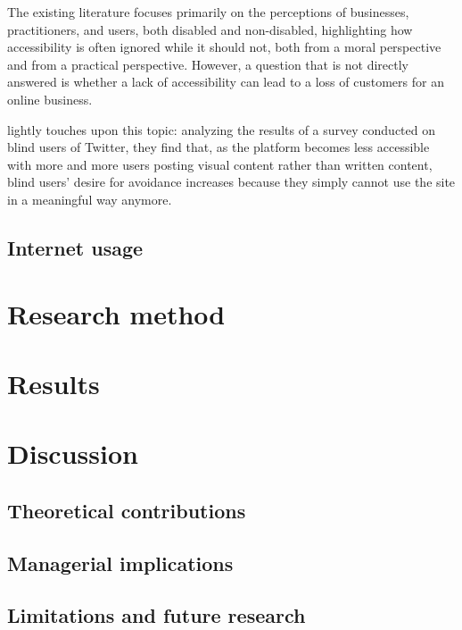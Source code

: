 \documentclass[12pt, a4paper]{article}
\begin{document}
The existing literature focuses primarily on the perceptions of businesses,
practitioners, and users, both disabled and non-disabled, highlighting how
accessibility is often ignored while it should not, both from a moral perspective and
from a practical perspective. However, a question that is not directly answered is
whether a lack of accessibility can lead to a loss of customers for an online business.

 lightly touches upon this topic: analyzing the results of a survey
conducted on blind users of Twitter, they find that, as the platform becomes less
accessible with more and more users posting visual content rather than written content,
blind users' desire for avoidance increases because they simply cannot use the site in a
meaningful way anymore.

\subsection{Internet usage}\label{sec:internet-usage}

\section{Research method}

\section{Results}

\section{Discussion}
\subsection{Theoretical contributions}
\subsection{Managerial implications}
\subsection{Limitations and future research}

\newpage


\end{document}

